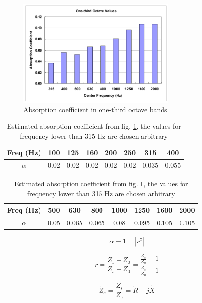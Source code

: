 \begin{figure}[H]
	\centering
	\includegraphics[width=0.7\textwidth]{fig/chap4/impedance/absorption_spectrum.png}
	\caption{Absorption coefficient in one-third octave bands \cite{Seybert2008MeasurementOP}}
	\label{fig:ground_absorption}
\end{figure}

\begin{table}[H]
	\caption{Estimated absorption coefficient from fig. \ref{fig:ground_absorption}, the values for frequency lower than 315 Hz are chosen arbitrary}
	\begin{tabular}{c|ccccccc}
		Freq (Hz)           & 100  & 125  & 160  & 200  & 250  & 315  & 400 \\ \hline
		$\alpha$ & 0.02 & 0.02 & 0.02 & 0.02 & 0.02 & 0.035 & 0.055
	\end{tabular}
	\newline
	\vspace*{10pt}
	\newline
	\begin{tabular}{c|ccccccc}
		Freq (Hz)  &  500  & 630  & 800  & 1000 & 1250 & 1600 & 2000 \\ \hline
		$\alpha$ & 0.05 & 0.065 & 0.065 & 0.08 & 0.095 & 0.105 & 0.105
	\end{tabular}
\end{table}

\begin{equation}
	\alpha = 1 - |r^2|
\end{equation}

\begin{equation}
	r = \frac{Z_s - Z_0}{Z_s + Z_0} = \frac{\frac{Z_s}{Z_0} - 1}{\frac{Z_s}{Z_0} + 1}
\end{equation}

\begin{equation}
	\tilde{Z_s} = \frac{Z_s}{Z_0} = \tilde{R} + j\tilde{X}
\end{equation}



